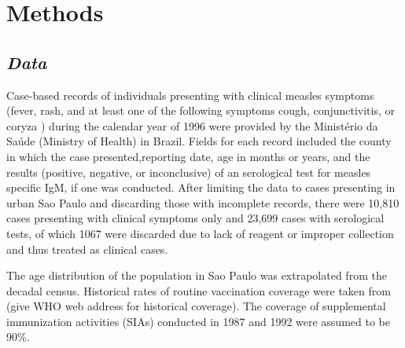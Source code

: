 \section{\texorpdfstring{\textbf{Methods}}{Methods}}\label{methods}

\subsection{\texorpdfstring{\emph{Data}}{Data}}\label{data}

Case-based records of individuals presenting with clinical measles
symptoms (fever, rash, and at least one of the following symptoms cough,
conjunctivitis, or coryza \cite{Hutchins_2004}) during the calendar year of 1996 were
provided by the Ministério da Saúde (Ministry of Health) in Brazil. Fields for each
record included the county in which the case presented,reporting date, age in months or years, and the
results (positive, negative, or inconclusive) of an serological test for
measles specific IgM, if one was conducted. After limiting the data to cases
presenting in urban Sao Paulo and discarding those with incomplete
records, there were 10,810 cases presenting with clinical symptoms only
and 23,699 cases with serological tests, of which 1067 were discarded
due to lack of reagent or improper collection and thus treated as
clinical cases.

The age distribution of the population in Sao Paulo was extrapolated
from the decadal census. Historical rates of routine vaccination
coverage were taken from (give WHO web address for historical coverage).
The coverage of supplemental immunization activities (SIAs) conducted in
1987 and 1992 were assumed to be 90\%.